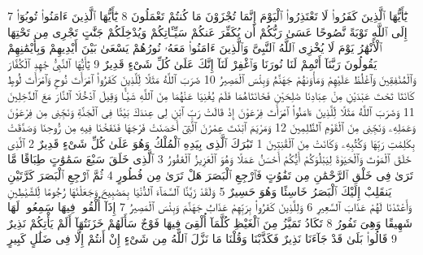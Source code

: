 {\tiny\colorbox{cl_aya}{7}} يَٰٓأَيُّهَا ٱلَّذِينَ كَفَرُوا۟ لَا تَعْتَذِرُوا۟ ٱلْيَوْمَ إِنَّمَا تُجْزَوْنَ مَا كُنتُمْ تَعْمَلُونَ
{\tiny\colorbox{cl_aya}{8}} يَٰٓأَيُّهَا ٱلَّذِينَ ءَامَنُوا۟ تُوبُوٓا۟ إِلَى ٱللَّهِ تَوْبَةً نَّصُوحًا عَسَىٰ رَبُّكُمْ أَن يُكَفِّرَ عَنكُمْ سَيِّـَٔاتِكُمْ وَيُدْخِلَكُمْ جَنَّٰتٍ تَجْرِى مِن تَحْتِهَا ٱلْأَنْهَٰرُ يَوْمَ لَا يُخْزِى ٱللَّهُ ٱلنَّبِىَّ وَٱلَّذِينَ ءَامَنُوا۟ مَعَهُۥ نُورُهُمْ يَسْعَىٰ بَيْنَ أَيْدِيهِمْ وَبِأَيْمَٰنِهِمْ يَقُولُونَ رَبَّنَآ أَتْمِمْ لَنَا نُورَنَا وَٱغْفِرْ لَنَآ إِنَّكَ عَلَىٰ كُلِّ شَىْءٍ قَدِيرٌ
{\tiny\colorbox{cl_aya}{9}} يَٰٓأَيُّهَا ٱلنَّبِىُّ جَٰهِدِ ٱلْكُفَّارَ وَٱلْمُنَٰفِقِينَ وَٱغْلُظْ عَلَيْهِمْ وَمَأْوَىٰهُمْ جَهَنَّمُ وَبِئْسَ ٱلْمَصِيرُ
{\tiny\colorbox{cl_aya}{10}} ضَرَبَ ٱللَّهُ مَثَلًا لِّلَّذِينَ كَفَرُوا۟ ٱمْرَأَتَ نُوحٍ وَٱمْرَأَتَ لُوطٍ كَانَتَا تَحْتَ عَبْدَيْنِ مِنْ عِبَادِنَا صَٰلِحَيْنِ فَخَانَتَاهُمَا فَلَمْ يُغْنِيَا عَنْهُمَا مِنَ ٱللَّهِ شَيْـًٔا وَقِيلَ ٱدْخُلَا ٱلنَّارَ مَعَ ٱلدَّٰخِلِينَ
{\tiny\colorbox{cl_aya}{11}} وَضَرَبَ ٱللَّهُ مَثَلًا لِّلَّذِينَ ءَامَنُوا۟ ٱمْرَأَتَ فِرْعَوْنَ إِذْ قَالَتْ رَبِّ ٱبْنِ لِى عِندَكَ بَيْتًا فِى ٱلْجَنَّةِ وَنَجِّنِى مِن فِرْعَوْنَ وَعَمَلِهِۦ وَنَجِّنِى مِنَ ٱلْقَوْمِ ٱلظَّٰلِمِينَ
{\tiny\colorbox{cl_aya}{12}} وَمَرْيَمَ ٱبْنَتَ عِمْرَٰنَ ٱلَّتِىٓ أَحْصَنَتْ فَرْجَهَا فَنَفَخْنَا فِيهِ مِن رُّوحِنَا وَصَدَّقَتْ بِكَلِمَٰتِ رَبِّهَا وَكُتُبِهِۦ وَكَانَتْ مِنَ ٱلْقَٰنِتِينَ
{\tiny\colorbox{cl_aya}{1}} تَبَٰرَكَ ٱلَّذِى بِيَدِهِ ٱلْمُلْكُ وَهُوَ عَلَىٰ كُلِّ شَىْءٍ قَدِيرٌ
{\tiny\colorbox{cl_aya}{2}} ٱلَّذِى خَلَقَ ٱلْمَوْتَ وَٱلْحَيَوٰةَ لِيَبْلُوَكُمْ أَيُّكُمْ أَحْسَنُ عَمَلًا وَهُوَ ٱلْعَزِيزُ ٱلْغَفُورُ
{\tiny\colorbox{cl_aya}{3}} ٱلَّذِى خَلَقَ سَبْعَ سَمَٰوَٰتٍ طِبَاقًا مَّا تَرَىٰ فِى خَلْقِ ٱلرَّحْمَٰنِ مِن تَفَٰوُتٍ فَٱرْجِعِ ٱلْبَصَرَ هَلْ تَرَىٰ مِن فُطُورٍ
{\tiny\colorbox{cl_aya}{4}} ثُمَّ ٱرْجِعِ ٱلْبَصَرَ كَرَّتَيْنِ يَنقَلِبْ إِلَيْكَ ٱلْبَصَرُ خَاسِئًا وَهُوَ حَسِيرٌ
{\tiny\colorbox{cl_aya}{5}} وَلَقَدْ زَيَّنَّا ٱلسَّمَآءَ ٱلدُّنْيَا بِمَصَٰبِيحَ وَجَعَلْنَٰهَا رُجُومًا لِّلشَّيَٰطِينِ وَأَعْتَدْنَا لَهُمْ عَذَابَ ٱلسَّعِيرِ
{\tiny\colorbox{cl_aya}{6}} وَلِلَّذِينَ كَفَرُوا۟ بِرَبِّهِمْ عَذَابُ جَهَنَّمَ وَبِئْسَ ٱلْمَصِيرُ
{\tiny\colorbox{cl_aya}{7}} إِذَآ أُلْقُوا۟ فِيهَا سَمِعُوا۟ لَهَا شَهِيقًا وَهِىَ تَفُورُ
{\tiny\colorbox{cl_aya}{8}} تَكَادُ تَمَيَّزُ مِنَ ٱلْغَيْظِ كُلَّمَآ أُلْقِىَ فِيهَا فَوْجٌ سَأَلَهُمْ خَزَنَتُهَآ أَلَمْ يَأْتِكُمْ نَذِيرٌ
{\tiny\colorbox{cl_aya}{9}} قَالُوا۟ بَلَىٰ قَدْ جَآءَنَا نَذِيرٌ فَكَذَّبْنَا وَقُلْنَا مَا نَزَّلَ ٱللَّهُ مِن شَىْءٍ إِنْ أَنتُمْ إِلَّا فِى ضَلَٰلٍ كَبِيرٍ
